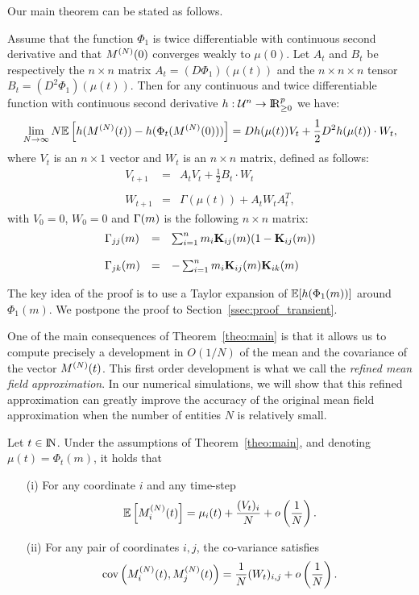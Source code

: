 \documentclass[review]{elsarticle}
\begin{document}
Our main theorem can be stated as follows. 
\begin{theorem}\label{theo:main}
  Assume that the function $\Phi_1$ is twice differentiable with
  continuous second derivative and that $M^{(N)}(0)$ converges weakly to
  $\mu(0)$. Let $A_t$ and $B_t$ be respectively the $n \times n$
  matrix $A_t = (D \Phi_1)(\mu(t))$ and the $n \times n \times n$
  tensor $B_t = (D^2 \Phi_1)(\mu(t))$.  Then for any continuous and
  twice differentiable function with continuous second derivative
  $h:{\cal U}^n \rightarrow \mathrm{I\!R}_{\geq 0}^p$ we have:
$$
\lim_{N\rightarrow \infty} N\esp{h(\vt{M}\aN(t))- h(\Phi_t(\vt{M}\aN(0)))} =
Dh(\mu(t)) V_t + \frac{1}{2}D^2h(\mu(t))\cdot W_t,
$$
where $V_t$ is an $n \times 1$ vector and $W_t$ is an $n \times n$ matrix, defined as follows:
$$
\begin{array}{lcl}
V_{t+1} & = & A_tV_t + \frac{1}{2}B_t \cdot W_t\\\\
W_{t+1} & = & \Gamma(\mu(t)) + A_t W_t A_t^T,
\end{array}
$$
with $V_0=0$, $W_0 = 0$ and $\Gamma(m)$ is the following
$n \times n$ matrix:
$$
\begin{array}{lcl}
\Gamma_{jj}(m) & = &  \sum_{i=1}^n m_i \mathbf{K}_{ij}(m)(1-\mathbf{K}_{ij}(m))\\\\
\Gamma_{jk}(m) & = & -\sum_{i=1}^n m_i \mathbf{K}_{ij}(m)\mathbf{K}_{ik}(m)
\end{array}
$$

\end{theorem}
The key idea of the proof is to use a Taylor expansion of
$\esp{h(\Phi_1(m))}$ around $\Phi_1(m)$.  We postpone the proof to
Section~\ref{ssec:proof_transient}.

One of the main consequences of Theorem~\ref{theo:main} is that it
allows us to compute precisely a development in $O(1/N)$ of the mean
and the covariance of the vector $M^{(N)}(t)$. This first order
development is what we call the \emph{refined mean field
  approximation}. In our numerical simulations, we will show that this
refined approximation can greatly improve the accuracy of the original
mean field approximation when the number of entities $N$ is relatively small.
\begin{coro}
  \label{coro:main}
  Let $t\in\mathrm{I\!N}$. Under the assumptions of Theorem~\ref{theo:main},
  and denoting $\mu(t)=\Phi_t(m)$, it holds that
  \begin{itemize}
  \item[(i)] For any coordinate $i$ and any time-step
    \begin{align*}
      \esp{\MN_i(t)} = \mu_i(t) + \frac{(V_{t})_i}{N} +  o\p{\frac1N}.
    \end{align*}
  \item[(ii)] For any pair of coordinates $i,j$, the co-variance satisfies
    \begin{align*}
      \mathrm{cov}\left(M^{(N)}_i(t),M^{(N)}_j(t)\right) = \frac1N(W_{t})_{i,j} + o\left(\frac1N\right). 
    \end{align*}
  \end{itemize}
\end{coro}
\end{document}
